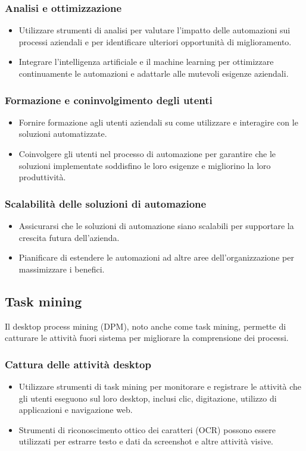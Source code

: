 \documentclass{article}
\begin{document}
\subsubsection{Analisi e ottimizzazione}
\begin{itemize}
    \item Utilizzare strumenti di analisi per valutare l'impatto delle automazioni sui processi aziendali e per identificare ulteriori opportunità di miglioramento.
    \item Integrare l'intelligenza artificiale e il machine learning per ottimizzare continuamente le automazioni e adattarle alle mutevoli esigenze aziendali.
\end{itemize}
\subsubsection{Formazione e coninvolgimento degli utenti}
\begin{itemize}
    \item Fornire formazione agli utenti aziendali su come utilizzare e interagire con le soluzioni automatizzate.
    \item Coinvolgere gli utenti nel processo di automazione per garantire che le soluzioni implementate soddisfino le loro esigenze e migliorino la loro produttività.
\end{itemize}
\subsubsection{Scalabilità delle soluzioni di automazione}
\begin{itemize}
    \item Assicurarsi che le soluzioni di automazione siano scalabili per supportare la crescita futura dell'azienda.
    \item Pianificare di estendere le automazioni ad altre aree dell'organizzazione per massimizzare i benefici.
\end{itemize}
\subsection{Task mining}
Il desktop process mining (DPM), noto anche come task mining, permette di catturare le attività fuori sistema per migliorare la comprensione dei processi.
\subsubsection{Cattura delle attività desktop}
\begin{itemize}
    \item Utilizzare strumenti di task mining per monitorare e registrare le attività che gli utenti eseguono sul loro desktop, inclusi clic, digitazione, utilizzo di applicazioni e navigazione web.
    \item Strumenti di riconoscimento ottico dei caratteri (OCR) possono essere utilizzati per estrarre testo e dati da screenshot e altre attività visive.
\end{itemize}
\end{document}
